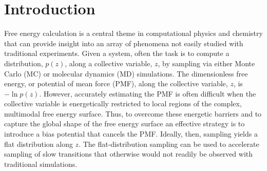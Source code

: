 \documentclass[reprint, superscriptaddress, floatfix]{revtex4-1}
\begin{document}
\maketitle



\section{Introduction}



Free energy calculation\cite{frenkel, newman} is a central theme
in computational physics and chemistry
that can provide insight into an array of phenomena not easily studied
with traditional experiments.
%
Given a system,
often the task is to compute
a distribution, $p(z)$,
along a collective variable, $z$, by sampling via either Monte Carlo\cite{
  frenkel, newman, landau_binder} (MC)
or molecular dynamics\cite{frenkel, karplus2002} (MD) simulations.
%
The dimensionless free energy, or potential of mean force (PMF),
along the collective variable, $z$,
is $-\ln p(z)$.
%
However, accurately estimating the PMF is often difficult
when the collective variable is energetically restricted to local regions
of the complex, multimodal free energy surface.
%
Thus,
to overcome these energetic barriers and
to capture the global shape of the free energy surface
an effective strategy is to introduce a bias potential that
cancels the PMF.
%
Ideally, then, sampling yields a flat distribution
along $z$\cite{mezei1987, berg1992, *lee1993,
wang2001, *wang2001pre,
huber1994,
*laio2002, *laio2008, *barducci2011, *sutto2012}.
%
The flat-distribution sampling can be used to accelerate
sampling of slow transitions that otherwise would not readily
be observed with traditional simulations.
%
\end{document}
